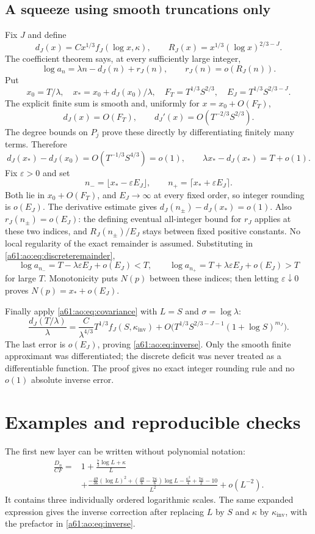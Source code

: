 \documentclass[11pt,letterpaper]{article}
\numberwithin{equation}{section}
\theoremstyle{remark}\newtheorem{remark}[theorem]{Remark}
\begin{document}
\subsection{A squeeze using smooth truncations only}
Fix $J$ and define
\[
 d_J(x)=Cx^{1/3}f_J(\log x,\kappa),\qquad
 R_J(x)=x^{1/3}(\log x)^{2/3-J}.
\]
The coefficient theorem says, at every sufficiently large integer,
\begin{equation}\label{a61:ao:eq:discreteremainder}
 \log a_n=\lambda n-d_J(n)+r_J(n),\qquad
 r_J(n)=o(R_J(n)).
\end{equation}
Put
\[
 x_0=T/\lambda,\quad x_*=x_0+d_J(x_0)/\lambda,
 \quad F_T=T^{1/3}S^{2/3},\quad E_J=T^{1/3}S^{2/3-J}.
\]
The explicit finite sum is smooth and, uniformly for
$x=x_0+O(F_T)$,
\[
 d_J(x)=O(F_T),\qquad d_J'(x)=O(T^{-2/3}S^{2/3}).
\]
The degree bounds on $P_j$ prove these directly by differentiating
finitely many terms. Therefore
\[
 d_J(x_*)-d_J(x_0)=O(T^{-1/3}S^{4/3})=o(1),
 \qquad \lambda x_*-d_J(x_*)=T+o(1).
\]
Fix $\varepsilon>0$ and set
\[
 n_- =\lfloor x_*-\varepsilon E_J\rfloor,\qquad
 n_+ =\lceil x_*+\varepsilon E_J\rceil.
\]
Both lie in $x_0+O(F_T)$, and $E_J\to\infty$ at every fixed order,
so integer rounding is $o(E_J)$. The derivative estimate gives
$d_J(n_\pm)-d_J(x_*)=o(1)$. Also
$r_J(n_\pm)=o(E_J)$: the defining eventual all-integer bound for
$r_J$ applies at these two indices, and $R_J(n_\pm)/E_J$ stays
between fixed positive constants. No local regularity of the exact
remainder is assumed. Substituting in \eqref{a61:ao:eq:discreteremainder},
\[
 \log a_{n_-}=T-\lambda\varepsilon E_J+o(E_J)<T,
 \qquad
 \log a_{n_+}=T+\lambda\varepsilon E_J+o(E_J)>T
\]
for large $T$. Monotonicity puts $N(p)$ between these indices; then
letting $\varepsilon\downarrow0$ proves
$N(p)=x_*+o(E_J)$.

Finally apply \eqref{a61:ao:eq:covariance} with $L=S$ and
$\sigma=\log\lambda$:
\[
 \frac{d_J(T/\lambda)}\lambda
 =\frac C{\lambda^{4/3}}T^{1/3}f_J(S,\kappa_{\mathrm{inv}})
 +O\bigl(T^{1/3}S^{2/3-J-1}(1+\log S)^{m_J}\bigr).
\]
The last error is $o(E_J)$, proving \eqref{a61:ao:eq:inverse}. Only the
smooth finite approximant was differentiated; the discrete deficit
was never treated as a differentiable function. The proof gives no
exact integer rounding rule and no $o(1)$ absolute inverse error.

\section{Examples and reproducible checks}\label{a61:ao:sec:checks}
The first new layer can be written without polynomial notation:
\[
 \begin{split}
 \frac{D_n}{CF}={}&1+\frac{\frac73\log L+\kappa}{L}\\
 &+\frac{-\frac{49}{36}(\log L)^2
 +(\frac{49}{6}-\frac{7\kappa}{6})\log L
 -\frac{\kappa^2}{4}+\frac{7\kappa}{2}-10}{L^2}
 +o(L^{-2}).
 \end{split}
\]
It contains three individually ordered logarithmic scales. The same
expanded expression gives the inverse correction after replacing
$L$ by $S$ and $\kappa$ by $\kappa_{\mathrm{inv}}$, with the
prefactor in \eqref{a61:ao:eq:inverse}.
\end{document}
